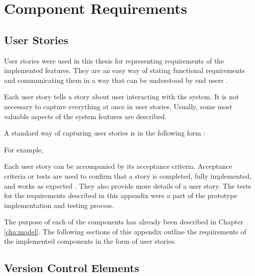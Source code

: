 \chapter{Component Requirements \label{app:specification}}

\section{User Stories}

User stories were used in this thesis for representing requirements of the
implemented features. They are an easy way of stating functional requirements
and communicating them in a way that can be understood by end users
\citep{Crispin2003}.

Each user story tells a story about user interacting with the system. It is not
necessary to capture everything at once in user stories. Usually, some most
valuable aspects of the system features are described.

A standard way of capturing user stories is in the following form
\citep{Cohn2004,Coplien2010}:


For example,


Each user story can be accompanied by its acceptance criteria. Acceptance
criteria or tests are used to confirm that a story is completed, fully
implemented, and works as expected \citep{Cohn2004}. They also provide more
details of a user story. The tests for the requirements described in this
appendix were a part of the prototype implementation and testing process.

The purpose of each of the components has already been described in Chapter
\ref{cha:model}. The following sections of this appendix outline the
requirements of the implemented components in the form of user stories.

\section{Version Control Elements}

